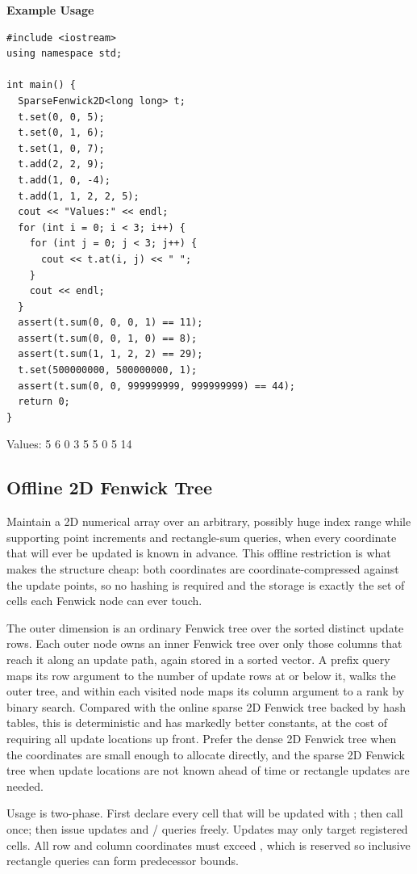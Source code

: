 \textbf{Example Usage}\par
\begin{lstlisting}[style=cpp]
#include <iostream>
using namespace std;

int main() {
  SparseFenwick2D<long long> t;
  t.set(0, 0, 5);
  t.set(0, 1, 6);
  t.set(1, 0, 7);
  t.add(2, 2, 9);
  t.add(1, 0, -4);
  t.add(1, 1, 2, 2, 5);
  cout << "Values:" << endl;
  for (int i = 0; i < 3; i++) {
    for (int j = 0; j < 3; j++) {
      cout << t.at(i, j) << " ";
    }
    cout << endl;
  }
  assert(t.sum(0, 0, 0, 1) == 11);
  assert(t.sum(0, 0, 1, 0) == 8);
  assert(t.sum(1, 1, 2, 2) == 29);
  t.set(500000000, 500000000, 1);
  assert(t.sum(0, 0, 999999999, 999999999) == 44);
  return 0;
}
\end{lstlisting}
\begin{exampleoutput}
Values:
5 6 0
3 5 5
0 5 14
\end{exampleoutput}
\subsection{Offline 2D Fenwick Tree}
\label{sec:2.7.7}
Maintain a 2D numerical array over an arbitrary, possibly huge index range while supporting point increments and rectangle-sum queries, when every coordinate that will ever be updated is known in advance. This offline restriction is what makes the structure cheap: both coordinates are coordinate-compressed against the update points, so no hashing is required and the storage is exactly the set of cells each Fenwick node can ever touch.

The outer dimension is an ordinary Fenwick tree over the sorted distinct update rows. Each outer node owns an inner Fenwick tree over only those columns that reach it along an update path, again stored in a sorted vector. A prefix query maps its row argument to the number of update rows at or below it, walks the outer tree, and within each visited node maps its column argument to a rank by binary search. Compared with the online sparse 2D Fenwick tree backed by hash tables, this is deterministic and has markedly better constants, at the cost of requiring all update locations up front. Prefer the dense 2D Fenwick tree when the coordinates are small enough to allocate directly, and the sparse 2D Fenwick tree when update locations are not known ahead of time or rectangle updates are needed.

Usage is two-phase. First declare every cell that will be updated with ; then call  once; then issue  updates and  /  queries freely. Updates may only target registered cells. All row and column coordinates must exceed , which is reserved so inclusive rectangle queries can form predecessor bounds.

